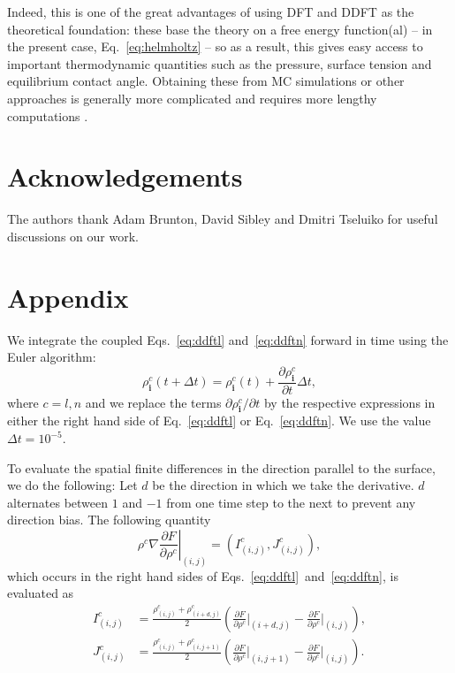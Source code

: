 \documentclass[journal=langd5,manuscript=article]{achemso}
\newcommand{\evalAt}[1]{\bigg |_{#1}}
\def\i{\mathbf{i}}
\begin{document}
Indeed, this is one of the great advantages of using DFT and DDFT as the theoretical foundation: these base the theory on a free energy function(al) -- in the present case, Eq.\ \eqref{eq:helmholtz} -- so as a result, this gives easy access to important thermodynamic quantities such as the pressure, surface tension and equilibrium contact angle. Obtaining these from MC simulations or other approaches is generally more complicated and requires more lengthy computations \cite{chalmers2017}.

\section*{Acknowledgements}

The authors thank Adam Brunton, David Sibley and Dmitri Tseluiko for useful discussions on our work.

\section{Appendix}

We integrate the coupled Eqs.~\eqref{eq:ddftl} and~\eqref{eq:ddftn}
forward in time using the Euler algorithm:
%
\begin{equation}
  \rho^c_\i(t + \Delta t)
    = \rho^c_\i(t)
    + \frac{\partial\rho^c_\i}{\partial t} \Delta t,
\label{eq:euler}
\end{equation}
%
where $c=l,n$ and we replace the terms $\partial \rho^c_\i /
\partial t$ by the respective expressions in either the right hand side of
Eq.~\eqref{eq:ddftl} or Eq.~\eqref{eq:ddftn}. We use the value $\Delta t
= 10^{-5}$.

To evaluate the spatial finite differences in the direction parallel to the surface, we do the following:
Let $d$ be the direction in which we take the derivative. $d$
alternates between $1$ and $-1$ from one time step to the next to
prevent any direction bias. The following quantity
%
\def\dfdc{\frac{\partial F}{\partial \rho^c}}
%
\begin{equation}
\rho^c\nabla \left. \frac{\partial F}{\partial \rho^c} \right|_{(i,j)} =
  \left( I^c_{(i,j)}, J^c_{(i,j)} \right),
\label{eq:finite-ij}
\end{equation}
%
which occurs in the right hand sides of
Eqs.~\eqref{eq:ddftl}~and~\eqref{eq:ddftn}, is evaluated as
%
\begin{align}
I^c_{(i,j)} &=
  \frac{\rho^c_{(i,j)} + \rho^c_{(i+d,j)}} 2
  \left( \dfdc\evalAt{(i+d,j)} - \dfdc\evalAt{(i,j)} \right),
\label{eq:finite-i}
\\
J^c_{(i,j)} &=
  \frac{\rho^c_{(i,j)} + \rho^c_{(i,j+1)}} 2
  \left( \dfdc\evalAt{(i,j+1)} - \dfdc\evalAt{(i,j)} \right).
\label{eq:finite-j}
\end{align}
\end{document}
